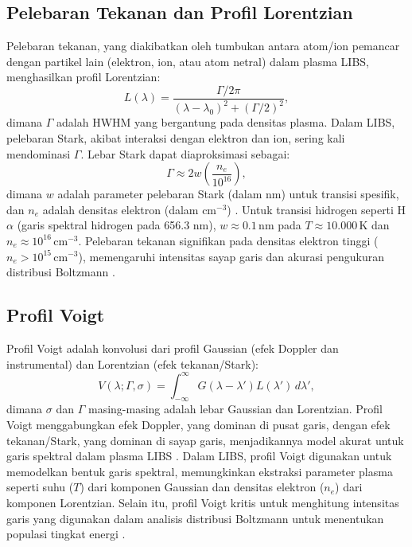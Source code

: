 \subsection{Pelebaran Tekanan dan Profil Lorentzian}
Pelebaran tekanan, yang diakibatkan oleh tumbukan antara atom/ion pemancar dengan partikel lain (elektron, ion, atau atom netral) dalam plasma LIBS, menghasilkan profil Lorentzian:
\begin{equation}
L(\lambda) = \frac{\Gamma / 2\pi}{(\lambda - \lambda_0)^2 + (\Gamma / 2)^2}, \label{eq:lorentzian}
\end{equation}
dimana \( \Gamma \) adalah HWHM yang bergantung pada densitas plasma. Dalam LIBS, pelebaran Stark, akibat interaksi dengan elektron dan ion, sering kali mendominasi \( \Gamma \). Lebar Stark dapat diaproksimasi sebagai:
\begin{equation}
\Gamma \approx 2w \left( \frac{n_e}{10^{16}} \right), \label{eq:stark_broadening}
\end{equation}
dimana \( w \) adalah parameter pelebaran Stark (dalam nm) untuk transisi spesifik, dan \( n_e \) adalah densitas elektron (dalam \( \text{cm}^{-3} \)) \citep{Griem1997,Konjevic1999}. Untuk transisi hidrogen seperti H\(\alpha\) (garis spektral hidrogen pada 656.3 nm), \( w \approx 0.1 \, \text{nm} \) pada \( T \approx 10.000 \, \text{K} \) dan \( n_e \approx 10^{16} \, \text{cm}^{-3} \). Pelebaran tekanan signifikan pada densitas elektron tinggi (\( n_e > 10^{15} \, \text{cm}^{-3} \)), memengaruhi intensitas sayap garis dan akurasi pengukuran distribusi Boltzmann \citep{Aragon2008}.

\subsection{Profil Voigt}
Profil Voigt adalah konvolusi dari profil Gaussian (efek Doppler dan instrumental) dan Lorentzian (efek tekanan/Stark):
\begin{equation}
V(\lambda; \Gamma, \sigma) = \int_{-\infty}^{\infty} G(\lambda - \lambda') L(\lambda') \, d\lambda', \label{eq:voigt}
\end{equation}
dimana \( \sigma \) dan \( \Gamma \) masing-masing adalah lebar Gaussian dan Lorentzian. Profil Voigt menggabungkan efek Doppler, yang dominan di pusat garis, dengan efek tekanan/Stark, yang dominan di sayap garis, menjadikannya model akurat untuk garis spektral dalam plasma LIBS \citep{Griem1997}. Dalam  LIBS, profil Voigt digunakan untuk memodelkan bentuk garis spektral, memungkinkan ekstraksi parameter plasma seperti suhu (\( T \)) dari komponen Gaussian dan densitas elektron (\( n_e \)) dari komponen Lorentzian. Selain itu, profil Voigt kritis untuk menghitung intensitas garis yang digunakan dalam analisis distribusi Boltzmann untuk menentukan populasi tingkat energi \citep{Miziolek2006,Aragon2008}.

